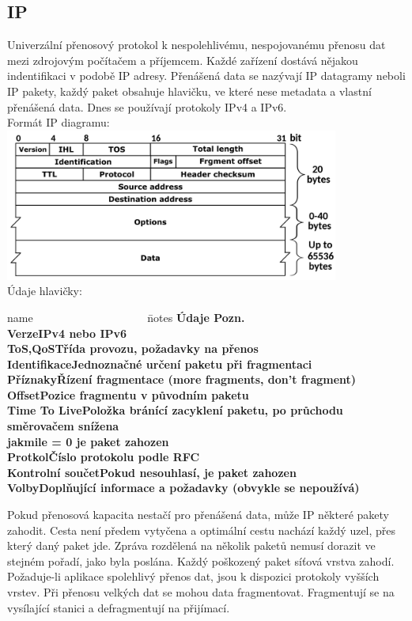 \subsection{IP}
Univerzální přenosový protokol k nespolehlivému, nespojovanému přenosu dat mezi zdrojovým počítačem a příjemcem.
Každé zařízení dostává nějakou indentifikaci v podobě IP adresy.
Přenášená data se nazývají IP datagramy neboli IP pakety, každý paket obsahuje hlavičku, ve které nese metadata a vlastní přenášená data.
Dnes se používají protokoly IPv4 a IPv6. \\
Formát IP diagramu: \\
\includegraphics[height=5cm]{TVY-POS/ISO-OSI-TCP-IP/IPv4.png} \\
Údaje hlavičky:
\begin{tabbing}
  name ~~~~~~~~~~~~~~~~~~~~\= notes \kill
  \bfseries Údaje \>\bfseries Pozn.\\[2mm]
  Verze\>IPv4 nebo IPv6\\
  ToS,QoS\>Třída provozu, požadavky na přenos\\
  Identifikace\>Jednoznačné určení paketu při fragmentaci\\
  Příznaky\>Řízení fragmentace (more fragments, don't fragment)\\
  Offset\>Pozice fragmentu v původním paketu\\
  Time To Live\>Položka bránící zacyklení paketu, po průchodu směrovačem snížena\\
  \>jakmile = 0 je paket zahozen\\
  Protkol\>Číslo protokolu podle RFC\\
  Kontrolní součet\>Pokud nesouhlasí, je paket zahozen\\
  Volby\>Doplňující informace a požadavky (obvykle se nepoužívá)\\
\end{tabbing}
Pokud přenosová kapacita nestačí pro přenášená data, může IP některé pakety zahodit.
Cesta není předem vytyčena a optimální cestu nachází každý uzel, přes který daný paket jde.
Zpráva rozdělená na několik paketů nemusí dorazit ve stejném pořadí, jako byla poslána.
Každý poškozený paket síťová vrstva zahodí.
Požaduje-li aplikace spolehlivý přenos dat, jsou k dispozici protokoly vyšších vrstev.
Při přenosu velkých dat se mohou data fragmentovat.
Fragmentují se na vysílající stanici a defragmentují na přijímací.